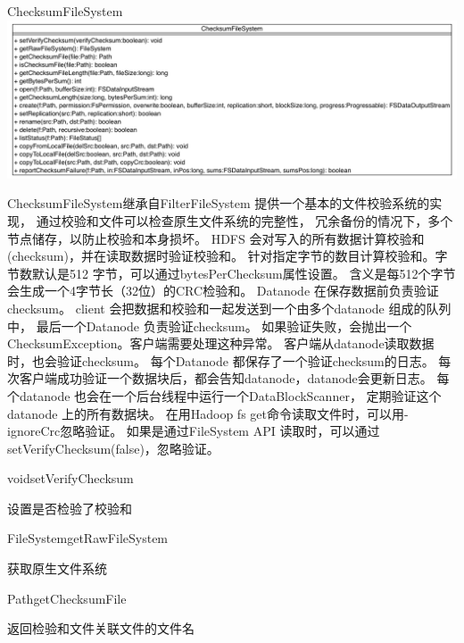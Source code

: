 \begin{XeClass}{ChecksumFileSystem}
\includegraphics[width=\textwidth]{cdig/ChecksumFileSystem.png}
     
 ChecksumFileSystem继承自FilterFileSystem
 提供一个基本的文件校验系统的实现，
 通过校验和文件可以检查原生文件系统的完整性，
 冗余备份的情况下，多个节点储存，以防止校验和本身损坏。
 HDFS 会对写入的所有数据计算校验和(checksum)，并在读取数据时验证校验和。
 针对指定字节的数目计算校验和。字节数默认是512 字节，可以通过bytesPerChecksum属性设置。
 含义是每512个字节会生成一个4字节长（32位）的CRC检验和。
 Datanode 在保存数据前负责验证checksum。
 client 会把数据和校验和一起发送到一个由多个datanode 组成的队列中，
 最后一个Datanode 负责验证checksum。
 如果验证失败，会抛出一个ChecksumException。客户端需要处理这种异常。   
 客户端从datanode读取数据时，也会验证checksum。
 每个Datanode 都保存了一个验证checksum的日志。
 每次客户端成功验证一个数据块后，都会告知datanode，datanode会更新日志。
 每个datanode 也会在一个后台线程中运行一个DataBlockScanner，
 定期验证这个 datanode 上的所有数据块。   
 在用Hadoop fs get命令读取文件时，可以用-ignoreCrc忽略验证。
 如果是通过FileSystem API 读取时，可以通过setVerifyChecksum(false)，忽略验证。 

    \begin{XeMethod}{\XePublic}{void}{setVerifyChecksum}
         
 设置是否检验了校验和

    \end{XeMethod}

    \begin{XeMethod}{\XePublic}{FileSystem}{getRawFileSystem}
         
 获取原生文件系统

    \end{XeMethod}

    \begin{XeMethod}{\XePublic}{Path}{getChecksumFile}
         
 返回检验和文件关联文件的文件名

    \end{XeMethod}


\end{XeClass}
